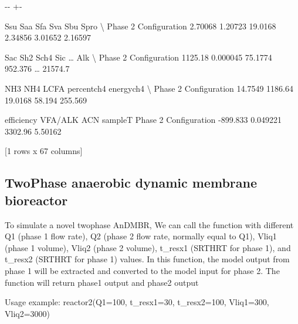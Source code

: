 \documentclass[a4paper,10pt,english]{sphinxmanual}
\newlength\nbsphinxcodecellspacing
\begin{document}
{

\kern-\sphinxverbatimsmallskipamount\kern-\baselineskip
\kern+\FrameHeightAdjust\kern-\fboxrule
\vspace{\nbsphinxcodecellspacing}

\begin{sphinxVerbatim}[commandchars=\\\{\}]
\llap{\color{nbsphinxout}[12]:\,\hspace{\fboxrule}\hspace{\fboxsep}}                          Ssu      Saa      Sfa      Sva      Sbu     Spro   \textbackslash{}
Phase 2 Configuration  2.70068  1.20723  19.0168  2.34856  3.01652  2.16597

                          Sac       Sh2     Sch4      Sic   {\ldots}     Alk   \textbackslash{}
Phase 2 Configuration  1125.18  0.000045  75.1774  952.376  {\ldots}  21574.7

                          NH3      NH4     LCFA    percentch4    energych4   \textbackslash{}
Phase 2 Configuration  14.7549  1186.64  19.0168        58.194      255.569

                       efficiency   VFA/ALK      ACN  sampleT
Phase 2 Configuration    -899.833  0.049221  3302.96  5.50162

[1 rows x 67 columns]
\end{sphinxVerbatim}
}


\subsection{Two\sphinxhyphen{}Phase anaerobic dynamic membrane bioreactor}
\label{\detokenize{jupyter_notebook/ADM1F_SRT_2phase:Two-Phase-anaerobic-dynamic-membrane-bioreactor}}
\sphinxAtStartPar
To simulate a novel two\sphinxhyphen{}phase AnDMBR, We can call the function  with different Q1 (phase 1 flow rate), Q2 (phase 2 flow rate, normally equal to Q1), Vliq1 (phase 1 volume), Vliq2 (phase 2 volume), t\_resx1 (SRT\sphinxhyphen{}HRT for phase 1), and t\_resx2 (SRT\sphinxhyphen{}HRT for phase 1) values. In this function, the model output from phase 1 will be extracted and converted to the model input for phase 2. The function will return phase1 output and phase2 output

\sphinxAtStartPar
Usage example: reactor2(Q1=100, t\_resx1=30, t\_resx2=100, Vliq1=300, Vliq2=3000)
\end{document}
